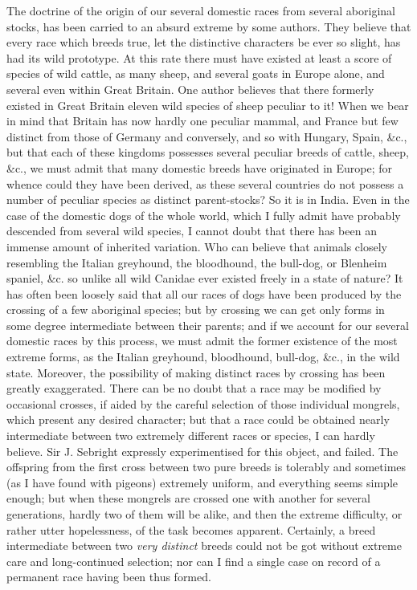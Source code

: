 \indent The doctrine of the origin of our several domestic races from several aboriginal stocks, has been carried to an absurd extreme by some authors. They believe that every race which breeds true, let the distinctive characters be ever so slight, has had its wild prototype. At this rate there must have existed at least a score of species of wild cattle, as many sheep, and several goats in Europe alone, and several even within Great Britain. One author believes that there formerly existed in Great Britain eleven wild species of sheep peculiar to it!  When we bear in mind that Britain has now hardly one peculiar mammal, and France but few distinct from those of Germany and conversely, and so with Hungary, Spain, \&c., but that each of these kingdoms possesses several peculiar breeds of cattle, sheep, \&c., we must admit that many domestic breeds have originated in Europe; for whence could they have been derived, as these several countries do not possess a number of peculiar species as distinct parent-stocks? So it is in India. Even in the case of the domestic dogs of the whole world, which I fully admit have probably descended from several wild species, I cannot doubt that there has been an immense amount of inherited variation. Who can believe that animals closely resembling the Italian greyhound, the bloodhound, the bull-dog, or Blenheim spaniel, \&c.  so unlike all wild Canidae ever existed freely in a state of nature? It has often been loosely said that all our races of dogs have been produced by the crossing of a few aboriginal species; but by crossing we can get only forms in some degree intermediate between their parents; and if we account for our several domestic races by this process, we must admit the former existence of the most extreme forms, as the Italian greyhound, bloodhound, bull-dog, \&c., in the wild state. Moreover, the possibility of making distinct races by crossing has been greatly exaggerated. There can be no doubt that a race may be modified by occasional crosses, if aided by the careful selection of those individual mongrels, which present any desired character; but that a race could be obtained nearly intermediate between two extremely different races or species, I can hardly believe. Sir J. Sebright expressly experimentised for this object, and failed. The offspring from the first cross between two pure breeds is tolerably and sometimes (as I have found with pigeons) extremely uniform, and everything seems simple enough; but when these mongrels are crossed one with another for several generations, hardly two of them will be alike, and then the extreme difficulty, or rather utter hopelessness, of the task becomes apparent.  Certainly, a breed intermediate between two \emph{very distinct} breeds could not be got without extreme care and long-continued selection; nor can I find a single case on record of a permanent race having been thus formed.     \\

